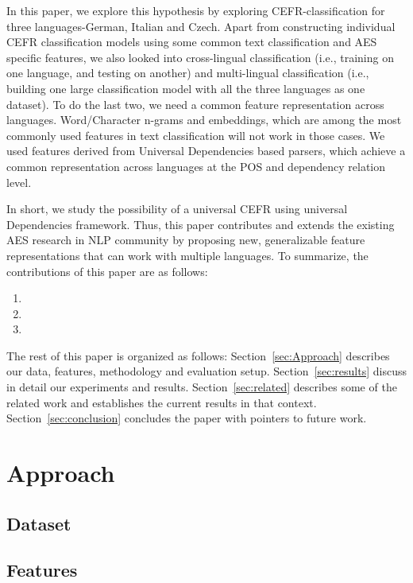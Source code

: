 \documentclass[11pt,a4paper]{article}
\begin{document}
In this paper, we explore this hypothesis by exploring CEFR-classification for three languages-German, Italian and Czech. Apart from constructing individual CEFR classification models using some common text classification and AES specific features, we also looked into cross-lingual classification (i.e., training on one language, and testing on another) and multi-lingual classification (i.e., building one large classification model with all the three languages as one dataset). To do the last two, we need a common feature representation across languages. Word/Character n-grams and embeddings, which are among the most commonly used features in text classification will not work in those cases. We used features derived from Universal Dependencies based parsers, which achieve a common representation across languages at the POS and dependency relation level. 

In short, we study the possibility of a universal CEFR using universal Dependencies framework. Thus, this paper contributes and extends the existing AES research in NLP community by proposing new, generalizable feature representations that can work with multiple languages. To summarize, the contributions of this paper are as follows: 
\begin{enumerate}
\item 
\item 
\item 
\end{enumerate}

The rest of this paper is organized as follows: Section~\ref{sec:Approach} describes our data, features, methodology and evaluation setup. Section~\ref{sec:results} discuss in detail our experiments and results. Section~\ref{sec:related} describes some of the related work and establishes the current results in that context. Section~\ref{sec:conclusion} concludes the paper with pointers to future work.

\section{Approach} %
\label{sec:approach}

\subsection{Dataset}


\subsection{Features}
\end{document}
